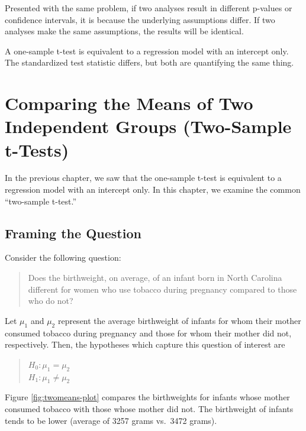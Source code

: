 \documentclass[]{book}
\theoremstyle{definition}
\theoremstyle{definition}
\theoremstyle{definition}
\theoremstyle{remark}
\let\BeginKnitrBlock\begin \let\EndKnitrBlock\end
\begin{document}
\BeginKnitrBlock{rmdkeyidea}
Presented with the same problem, if two analyses result in different
p-values or confidence intervals, it is because the underlying
assumptions differ. If two analyses make the same assumptions, the
results will be identical.
\EndKnitrBlock{rmdkeyidea}

A one-sample t-test is equivalent to a regression model with an
intercept only. The standardized test statistic differs, but both are
quantifying the same thing.

\chapter{Comparing the Means of Two Independent Groups (Two-Sample
t-Tests)}\label{TwoMeans}

In the previous chapter, we saw that the one-sample t-test is equivalent
to a regression model with an intercept only. In this chapter, we
examine the common ``two-sample t-test.''

\section{Framing the Question}\label{framing-the-question-2}

Consider the following question:

\begin{quote}
Does the birthweight, on average, of an infant born in North Carolina
different for women who use tobacco during pregnancy compared to those
who do not?
\end{quote}

Let \(\mu_1\) and \(\mu_2\) represent the average birthweight of infants
for whom their mother consumed tobacco during pregnancy and those for
whom their mother did not, respectively. Then, the hypotheses which
capture this question of interest are

\begin{quote}
\(H_0: \mu_1 = \mu_2\)\\
\(H_1: \mu_1 \neq \mu_2\)
\end{quote}

Figure \ref{fig:twomeans-plot} compares the birthweights for infants
whose mother consumed tobacco with those whose mother did not. The
birthweight of infants tends to be lower (average of 3257 grams vs.~3472
grams).
\end{document}
